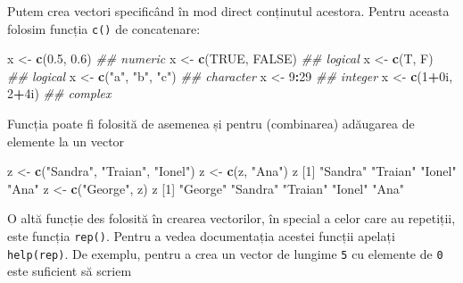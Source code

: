 \documentclass[]{article}
\newenvironment{Shaded}{\begin{snugshade}}{\end{snugshade}}
\newcommand{\CommentTok}[1]{\textcolor[rgb]{0.56,0.35,0.01}{\textit{#1}}}
\newcommand{\DecValTok}[1]{\textcolor[rgb]{0.00,0.00,0.81}{#1}}
\newcommand{\FloatTok}[1]{\textcolor[rgb]{0.00,0.00,0.81}{#1}}
\newcommand{\KeywordTok}[1]{\textcolor[rgb]{0.13,0.29,0.53}{\textbf{#1}}}
\newcommand{\NormalTok}[1]{#1}
\newcommand{\OperatorTok}[1]{\textcolor[rgb]{0.81,0.36,0.00}{\textbf{#1}}}
\newcommand{\OtherTok}[1]{\textcolor[rgb]{0.56,0.35,0.01}{#1}}
\newcommand{\StringTok}[1]{\textcolor[rgb]{0.31,0.60,0.02}{#1}}
\begin{document}
Putem crea vectori specificând în mod direct conținutul acestora. Pentru
aceasta folosim funcția \texttt{c()} de concatenare:

\begin{Shaded}
\begin{Highlighting}[]
\NormalTok{x <-}\StringTok{ }\KeywordTok{c}\NormalTok{(}\FloatTok{0.5}\NormalTok{, }\FloatTok{0.6}\NormalTok{)       }\CommentTok{## numeric}
\NormalTok{x <-}\StringTok{ }\KeywordTok{c}\NormalTok{(}\OtherTok{TRUE}\NormalTok{, }\OtherTok{FALSE}\NormalTok{)    }\CommentTok{## logical}
\NormalTok{x <-}\StringTok{ }\KeywordTok{c}\NormalTok{(T, F)           }\CommentTok{## logical}
\NormalTok{x <-}\StringTok{ }\KeywordTok{c}\NormalTok{(}\StringTok{"a"}\NormalTok{, }\StringTok{"b"}\NormalTok{, }\StringTok{"c"}\NormalTok{)  }\CommentTok{## character}
\NormalTok{x <-}\StringTok{ }\DecValTok{9}\OperatorTok{:}\DecValTok{29}              \CommentTok{## integer}
\NormalTok{x <-}\StringTok{ }\KeywordTok{c}\NormalTok{(}\DecValTok{1}\OperatorTok{+}\NormalTok{0i, }\DecValTok{2}\OperatorTok{+}\NormalTok{4i)     }\CommentTok{## complex}
\end{Highlighting}
\end{Shaded}

Funcția poate fi folosită de asemenea și pentru (combinarea) adăugarea
de elemente la un vector

\begin{Shaded}
\begin{Highlighting}[]
\NormalTok{z <-}\StringTok{ }\KeywordTok{c}\NormalTok{(}\StringTok{"Sandra"}\NormalTok{, }\StringTok{"Traian"}\NormalTok{, }\StringTok{"Ionel"}\NormalTok{)}
\NormalTok{z <-}\StringTok{ }\KeywordTok{c}\NormalTok{(z, }\StringTok{"Ana"}\NormalTok{)}
\NormalTok{z}
\NormalTok{[}\DecValTok{1}\NormalTok{] }\StringTok{"Sandra"} \StringTok{"Traian"} \StringTok{"Ionel"}  \StringTok{"Ana"}   
\NormalTok{z <-}\StringTok{ }\KeywordTok{c}\NormalTok{(}\StringTok{"George"}\NormalTok{, z)}
\NormalTok{z}
\NormalTok{[}\DecValTok{1}\NormalTok{] }\StringTok{"George"} \StringTok{"Sandra"} \StringTok{"Traian"} \StringTok{"Ionel"}  \StringTok{"Ana"}   
\end{Highlighting}
\end{Shaded}

O altă funcție des folosită în crearea vectorilor, în special a celor
care au repetiții, este funcția \texttt{rep()}. Pentru a vedea
documentația acestei funcții apelați \texttt{help(rep)}. De exemplu,
pentru a crea un vector de lungime \texttt{5} cu elemente de \texttt{0}
este suficient să scriem
\end{document}
